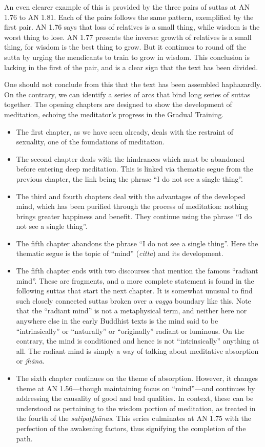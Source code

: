 \documentclass[12pt,openany]{book}%
\begin{document}
An even clearer example of this is provided by the three pairs of suttas at AN 1.76 to AN 1.81. Each of the pairs follows the same pattern, exemplified by the first pair. AN 1.76 says that loss of relatives is a small thing, while wisdom is the worst thing to lose. AN 1.77 presents the inverse: growth of relatives is a small thing, for wisdom is the best thing to grow. But it continues to round off the sutta by urging the mendicants to train to grow in wisdom. This conclusion is lacking in the first of the pair, and is a clear sign that the text has been divided.

One should not conclude from this that the text has been assembled haphazardly. On the contrary, we can identify a series of arcs that bind long series of suttas together. The opening chapters are designed to show the development of meditation, echoing the meditator’s progress in the Gradual Training.

\begin{itemize}%
\item The first chapter, as we have seen already, deals with the restraint of sexuality, one of the foundations of meditation.%
\item The second chapter deals with the hindrances which must be abandoned before entering deep meditation. This is linked via thematic segue from the previous chapter, the link being the phrase “I do not see a single thing”.%
\item The third and fourth chapters deal with the advantages of the developed mind, which has been purified through the process of meditation: nothing brings greater happiness and benefit. They continue using the phrase “I do not see a single thing”.%
\item The fifth chapter abandons the phrase “I do not see a single thing”. Here the thematic segue is the topic of “mind” (\textit{citta}) and its development.%
\item The fifth chapter ends with two discourses that mention the famous “radiant mind”. These are fragments, and a more complete statement is found in the following suttas that start the next chapter. It is somewhat unusual to find such closely connected suttas broken over a \textit{vagga} boundary like this. Note that the “radiant mind” is not a metaphysical term, and neither here nor anywhere else in the early Buddhist texts is the mind said to be “intrinsically” or “naturally” or “originally” radiant or luminous. On the contrary, the mind is conditioned and hence is not “intrinsically” anything at all. The radiant mind is simply a way of talking about meditative absorption or \textit{\textsanskrit{jhāna}}.%
\item The sixth chapter continues on the theme of absorption. However, it changes theme at AN 1.56—though maintaining focus on “mind”—and continues by addressing the causality of good and bad qualities. In context, these can be understood as pertaining to the wisdom portion of meditation, as treated in the fourth of the \textit{\textsanskrit{satipaṭṭhānas}}. This series culminates at AN 1.75 with the perfection of the awakening factors, thus signifying the completion of the path.%
\end{itemize}
\end{document}
